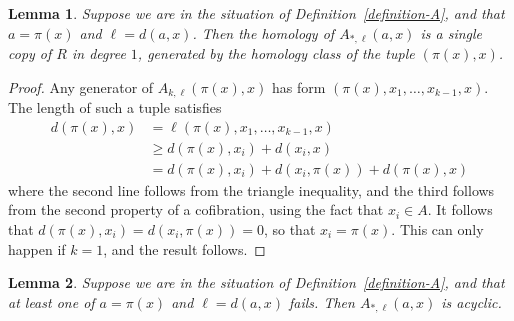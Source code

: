 \documentclass[a4paper, 11 pt, oneside, reqno]{amsart}
\newtheorem{lemma}{Lemma}
\numberwithin{lemma}{section}
\theoremstyle{definition}
\begin{document}
\begin{lemma}\label{A-not-acyclic}
    Suppose we are in the situation of 
    Definition~\ref{definition-A},
    and that $a=\pi(x)$ and $\ell=d(a,x)$.
    Then the homology of $A_{\ast,\ell}(a,x)$ is a
    single copy of $R$ in degree $1$,
    generated by the homology class of the tuple $(\pi(x),x)$.
\end{lemma}

\begin{proof}
    Any generator of $A_{k,\ell}(\pi(x),x)$ has form 
    $(\pi(x),x_1,\ldots,x_{k-1},x)$.
    The length of such a tuple  satisfies 
    \begin{align*}
        d(\pi(x),x)
        &=
        \ell(\pi(x),x_1,\ldots,x_{k-1},x)
        \\
        &\geq 
        d(\pi(x),x_i)+d(x_i,x)
        \\
        &=
        d(\pi(x),x_i)+d(x_i,\pi(x))+d(\pi(x),x)
    \end{align*}
    where the second line follows from the triangle inequality,
    and the third follows from the second property 
    of a cofibration,
    using the fact that $x_i\in A$.
    It follows that $d(\pi(x),x_i)=d(x_i,\pi(x))=0$, so that 
    $x_i=\pi(x)$. 
    This can only happen if $k=1$, and the  result follows. 
\end{proof}
    
\begin{lemma}\label{A-acyclic}
    Suppose we are in the situation of 
    Definition~\ref{definition-A},
    and that at least one of $a=\pi(x)$ and $\ell=d(a,x)$ fails.
    Then $A_{\ast,\ell}(a,x)$ is acyclic.
\end{lemma}
\end{document}
